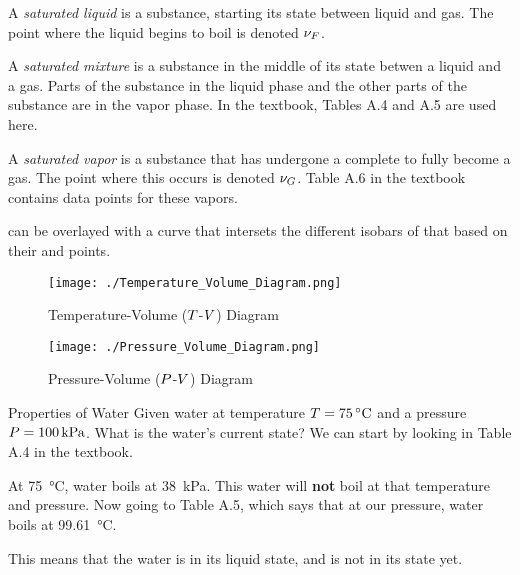 \begin{definition}\label{def:Saturated_Liquid}
  A \emph{saturated liquid} is a substance, starting its  state between liquid and gas.
  The point where the liquid begins to boil is denoted $\nu_{F}$.
\end{definition}

\begin{definition}\label{def:Saturated_Mixture}
  A \emph{saturated mixture} is a substance in the middle of its  state betwen a liquid and a gas.
  Parts of the substance in the liquid phase and the other parts of the substance are in the vapor phase.
  In the textbook, Tables A.4 and A.5 are used here.
\end{definition}

\begin{definition}\label{def:Saturated_Vapor}
  A \emph{saturated vapor} is a substance that has undergone a complete  to fully become a gas.
  The point where this occurs is denoted $\nu_{G}$.
  Table A.6 in the textbook contains data points for these vapors.
\end{definition}

 can be overlayed with a curve that intersets the different isobars of that  based on their  and  points.

\begin{figure}[h!tbp]
  \centering
  \texttt{[image: ./Temperature\_Volume\_Diagram.png]}
  \caption{Temperature-Volume ($T$-$V$) Diagram}
  \label{fig:Temperature_Pressure_Diagram}
\end{figure}

\begin{figure}[h!tbp]
  \centering
  \texttt{[image: ./Pressure\_Volume\_Diagram.png]}
  \caption{Pressure-Volume ($P$-$V$) Diagram}
  \label{fig:Pressure_Volume_Diagram}
\end{figure}


\begin{example}{Properties of Water}
  Given water at temperature $\Temp = \SI{75}{\degreeCelsius}$ and a pressure $P = \SI{100}{\kilo\pascal}$.
  What is the water's current state?
  \tcblower{}
  We can start by looking in Table A.4 in the textbook.

  At \SI{75}{\degreeCelsius}, water boils at \SI{38}{\kilo\pascal}.
  This water will \textbf{not} boil at that temperature and pressure.
  Now going to Table A.5, which says that at our pressure, water boils at \SI{99.61}{\degreeCelsius}.

  This means that the water is in its liquid state, and is not in its  state yet.
\end{example}

